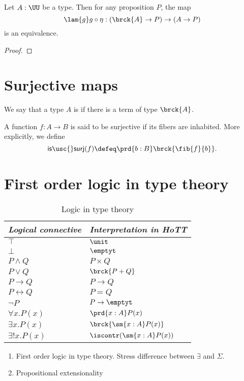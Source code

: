 \begin{thm}
Let $A:\UU$ be a type. Then for any proposition $P$, the map
\begin{equation*}
\lam{g} g\circ \eta : (\brck{A}\to P)\to (A\to P)
\end{equation*}
is an equivalence.
\end{thm}

\begin{proof}

\end{proof}

\section{Surjective maps}

\begin{defn}
We say that a type $A$ is  if there is a term of type $\brck{A}$. 
\end{defn}

\begin{defn}
A function $f:A\to B$ is said to be surjective if its fibers are inhabited. 
More explicitly, we define
\begin{equation*}
\mathsf{is\usc{}surj}(f)\defeq \prd{b:B}\brck{\fib{f}{b}}. 
\end{equation*}
\end{defn}

\section{First order logic in type theory}
\begin{table}
\caption{Logic in type theory}
\begin{center}
\begin{tabular}{ll}
\toprule
\emph{Logical connective} & \emph{Interpretation in HoTT} \\
\midrule
$\top$ & $\unit$ \\
$\bot$ & $\emptyt$ \\
$P\land Q$ & $P\times Q$ \\
$P\lor Q$ & $\brck{P+Q}$ \\
$P\to Q$ & $P\to Q$ \\
$P\leftrightarrow Q$ & $P=Q$ \\
$\neg P$ & $P\to\emptyt$ \\
$\forall x.P(x)$ & $\prd{x:A}P(x)$ \\
$\exists x.P(x)$ & $\brck{\sm{x:A}P(x)}$ \\
$\exists! x.P(x)$ & $\iscontr(\sm{x:A}P(x))$ \\
\bottomrule
\end{tabular}
\end{center}
\end{table}
\begin{enumerate}
\item First order logic in type theory. Stress difference between $\exists$ and $\Sigma$.
\item Propositional extensionality
\end{enumerate}

